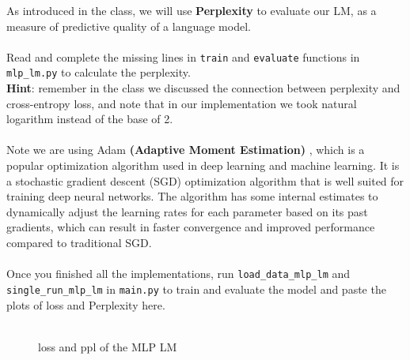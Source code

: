As introduced in the class, we will use \textbf{Perplexity} to evaluate our LM, as a measure of predictive quality of a language model. \\\\
\noindent \todo{} Read and complete the missing lines in \texttt{train} and \texttt{evaluate} functions in \texttt{mlp\_lm.py} to calculate the perplexity.\\
\noindent \textbf{Hint}: remember in the class we discussed the connection between perplexity and cross-entropy loss, and note that in our implementation we took natural logarithm instead of the base of 2.\\\\
Note we are using Adam \textbf{(Adaptive Moment Estimation)} \citep{kingma2015adam}, which is a popular optimization algorithm used in deep learning and machine learning. It is a stochastic gradient descent (SGD) optimization algorithm that is well suited for training deep neural networks. The algorithm has some internal estimates to dynamically adjust the learning rates for each parameter based on its past gradients, which can result in faster convergence and improved performance compared to traditional SGD.\\\\
\noindent \todo{} Once you finished all the implementations, run \texttt{load\_data\_mlp\_lm} and \texttt{single\_run\_mlp\_lm} in \texttt{main.py} to train and evaluate the model and paste the plots of loss and Perplexity here.\\
\noindent {\color{red}{your plots}}\\
\begin{figure}[h] 
    \centering
    \hfill
    \caption{loss and ppl of the MLP LM}
\end{figure}

